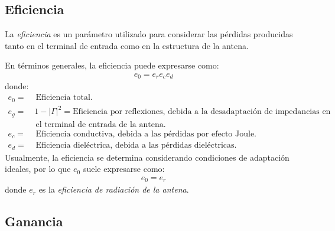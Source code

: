 \subsection{Eficiencia}
\label{subsec_intro_eficien}

La \emph{eficiencia} es un parámetro utilizado para considerar las pérdidas producidas tanto en el terminal de entrada como en la estructura de la antena.

En términos generales, la eficiencia puede expresarse como:
\begin{align}
e_0 = e_re_ce_d
\label{ec_intro:25}
\end{align}
donde:
\begin{align*}
e_0 = &\text{ Eficiencia total.}\\
e_g = &\,1 - \left|\Gamma\right|^2 = \text{Eficiencia por reflexiones, debida a la desadaptación de impedancias en}\\
&\text{ el terminal de entrada de la antena.}\\
e_c = &\text{ Eficiencia conductiva, debida a las pérdidas por efecto Joule.}\\
e_d = &\text{ Eficiencia dieléctrica, debida a las pérdidas dieléctricas.}
\end{align*}
Usualmente, la eficiencia se determina considerando condiciones de adaptación ideales, por lo que $e_0$ suele expresarse como:
\begin{align}
e_0 = e_r
\label{ec_intro:26}
\end{align}
donde $e_r$ es la \emph{eficiencia de radiación de la antena}.

\subsection{Ganancia}
\label{subsec_intro_ganancia}

